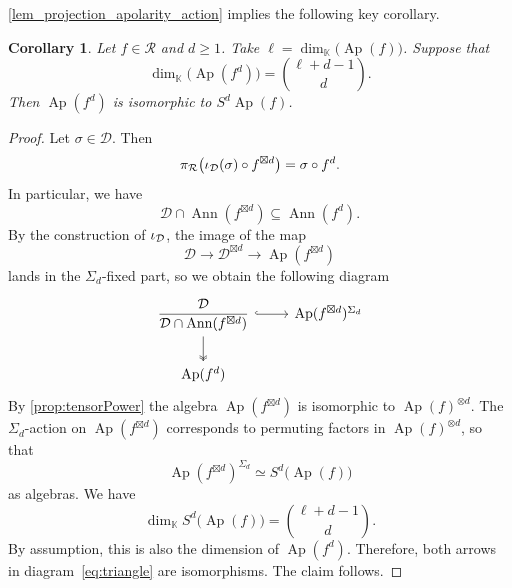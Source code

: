 \documentclass[a4paper,11pt,reqno]{amsart}
\newcommand{\calD}{\mathcal{D}}
\newcommand{\calR}{\mathcal{R}}
\newcommand{\bbK}{\mathbb{K}}
\DeclareMathOperator{\Ann}{Ann}
\DeclareMathOperator{\Ap}{Ap}
\numberwithin{equation}{section}
\theoremstyle{definition}
\theoremstyle{plain}
\newtheorem{cor}[defn]{Corollary}
\theoremstyle{remark}
\begin{document}
\autoref{lem_projection_apolarity_action} implies the following key corollary.
\begin{cor}
\label{cor_apolar_algebra_p^d_lower_p_otimes_d}
Let $f\in\calR$ and $d\geq 1$. Take $\ell = \dim_{\bbK} \bigl(\Ap(f)\bigr)$. Suppose that
\[
    \dim_{\bbK} \bigl(\Ap(f^d)\bigr) = \binom{\ell+d-1}{d}.
\]
Then $\Ap(f^d)$ is isomorphic to $S^d \Ap(f)$.
\end{cor}
\begin{proof}
Let $\sigma\in\calD$. Then
\[
\projR\bigl(\injD(\sigma)\circ f^{\boxtimes d}\bigr)=\sigma\circ f^d.
\]
In particular, we have \[\calD\cap\Ann(f^{\boxtimes d})\subseteq\Ann(f^d).\]
By the construction of $\injD$, the image of the map \[\calD\to \calD^{\boxtimes d}\to \Ap(f^{\boxtimes d})\]
lands in the $\Sigma_d$-fixed part, so we obtain the following diagram
\begin{equation}\label{eq:triangle}
    \begin{tikzcd}
        \dfrac{\calD}{\calD\cap\Ann(f^{\boxtimes d})} \ar[r, hook]\ar[d,
        two heads] & \Ap(f^{\boxtimes d})^{\Sigma_d}\\
        \Ap(f^d)
    \end{tikzcd}
\end{equation}
By \autoref{prop:tensorPower} the algebra $\Ap(f^{\boxtimes d})$ is
isomorphic to $\Ap(f)^{\otimes d}$. The $\Sigma_d$-action on $\Ap(f^{\boxtimes
d})$ corresponds to permuting factors in $\Ap(f)^{\otimes d}$, so that
\[\Ap(f^{\boxtimes d})^{\Sigma_d}  \simeq S^d\bigl(\Ap(f)\bigr)\] as algebras. We have
\[\dim_{\bbK} S^d\bigl(\Ap(f)\bigr) = \binom{\ell+d-1}{d}.\] By assumption, this is also the
dimension of $\Ap(f^d)$. Therefore, both arrows in diagram~\eqref{eq:triangle} are
isomorphisms. The claim follows.
\end{proof}
\end{document}
